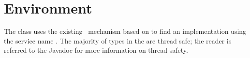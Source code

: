\section{Environment}
\label{sse_environment}

The  class uses the existing \jaxrs\ mechanism based on  to find an implementation using the service name . The majority of types in the  are thread safe; the reader is referred to the Javadoc for more information on thread safety.


